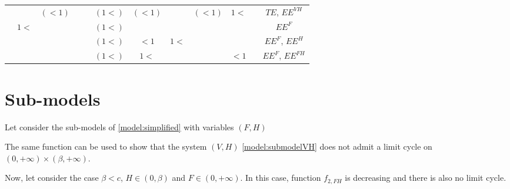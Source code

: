 \documentclass{article}
\begin{document}
\begin{landscape}
\begin{table}
\begin{tabular}{c|c|c|c|c|c|c|c|c|c|c|c}
 &  & $(<1)$ & & &$(1<)$ &$(<1)$ &  &$(<1)$ & $1<$ & & $TE$, $EE^{VH}$ \\
 \cline{2-11}
 & \multirow{3}{*}{$1<$} & & & &$(1<)$ & & & & & & $EE^F$ \\
 & & & & &$(1<)$ &$<1$ & $1<$ & & & & $EE^F$, $EE^H$ \\
 & & & & &$(1<)$ &$1<$ & & & $<1$ & & $EE^F$, $EE^{FH}$ \\
\end{tabular}
\end{table}

\end{landscape}

\section{Sub-models}
Let consider the sub-models of \eqref{model:simplified} with variables $(F,H)$ 

The same function can be used to show that the system $(V,H)$ \eqref{model:submodelVH} does not admit a limit cycle on $(0, +\infty) \times (\beta, +\infty)$.

Now, let consider the case $\beta < c$, $ H \in (0,\beta)$ and $F \in (0, +\infty)$. In this case, function $f_{2,FH}$  is decreasing and there is also no limit cycle.
\end{document}
